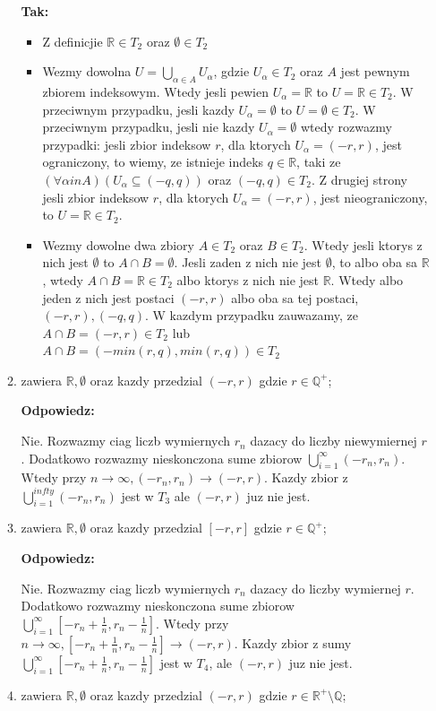\documentclass{article}
\begin{document}
\begin{enumerate}
\begin{enumerate}[label={$T_{\arabic*} :$}]
                \textbf{Tak:}

                \begin{itemize}
                    \item Z definicjie $\mathbb{R} \in T_{2}$ oraz $\emptyset \in T_{2}$
                    \item Wezmy dowolna $U = \bigcup\limits_{\alpha \in A}U_{\alpha}$, gdzie $U_{\alpha} \in T_{2}$ oraz $A$ jest pewnym zbiorem indeksowym. Wtedy jesli pewien $U_{\alpha} = \mathbb{R}$ to $U = \mathbb{R} \in T_{2}$. W przeciwnym przypadku, jesli kazdy $U_{\alpha} = \emptyset$ to $U = \emptyset \in T_{2}$. W przeciwnym przypadku, jesli nie kazdy $U_{\alpha} = \emptyset$ wtedy rozwazmy przypadki: jesli zbior indeksow $r$, dla ktorych $U_{\alpha} = (-r,r)$, jest ograniczony, to wiemy, ze istnieje indeks $q \in  \mathbb{R}$, taki ze $(\forall \alpha in A)(U_{\alpha} \subseteq (-q,q))$ oraz $(-q,q) \in T_{2}$. Z drugiej strony jesli zbior indeksow $r$, dla ktorych $U_{\alpha} = (-r,r)$, jest nieograniczony, to $U = \mathbb{R} \in T_{2}$. 
                    \item Wezmy dowolne dwa zbiory $A \in T_{2}$ oraz $B \in T_{2}$. Wtedy jesli ktorys z nich jest $\emptyset$ to $A \cap B = \emptyset$. Jesli zaden z nich nie jest $\emptyset$, to albo oba sa $\mathbb{R}$, wtedy $A \cap B = \mathbb{R} \in T_{2}$ albo ktorys z nich nie jest $ \mathbb{R}$. Wtedy albo jeden z nich jest postaci $(-r,r)$ albo oba sa tej postaci, $(-r,r), (-q,q)$. W kazdym przypadku zauwazamy, ze $A \cap B = (-r,r) \in T_{2}$ lub $A \cap B = (-min(r,q), min(r,q)) \in T_{2}$
                \end{itemize}
            \item zawiera $\mathbb{R}, \emptyset$ oraz kazdy przedzial $(-r,r)$ gdzie $r \in {\mathbb{Q}}^{+}$;

                \textbf{Odpowiedz:}

                Nie. Rozwazmy ciag liczb wymiernych $r_{n}$ dazacy do liczby niewymiernej $r$. Dodatkowo rozwazmy nieskonczona sume zbiorow $\bigcup\limits_{i=1}^{\infty}(-r_{n}, r_{n})$. Wtedy przy $n \rightarrow \infty, (-r_{n}, r_{n}) \rightarrow (-r, r)$. Kazdy zbior z  $\bigcup\limits_{i=1}^{infty}(-r_{n}, r_{n})$ jest w $T_{3}$ ale $(-r, r)$ juz nie jest.
            \item zawiera $\mathbb{R}, \emptyset$ oraz kazdy przedzial $[-r,r]$ gdzie $r \in {\mathbb{Q}}^{+}$;

                \textbf{Odpowiedz:}

                Nie. Rozwazmy ciag liczb wymiernych $r_{n}$ dazacy do liczby wymiernej $r$. Dodatkowo rozwazmy nieskonczona sume zbiorow $\bigcup\limits_{i=1}^{\infty}[-r_{n} + \frac{1}{n}, r_{n} - \frac{1}{n}]$. Wtedy przy $n  \rightarrow \infty, [-r_{n} + \frac{1}{n}, r_{n} - \frac{1}{n}] \rightarrow (-r, r)$. Kazdy zbior z sumy  $\bigcup\limits_{i=1}^{\infty}[-r_{n} + \frac{1}{n}, r_{n} - \frac{1}{n}]$ jest w $T_{4}$, ale $(-r, r)$ juz nie jest.
            \item zawiera $\mathbb{R}, \emptyset$ oraz kazdy przedzial $(-r,r)$ gdzie $r \in {\mathbb{R}}^{+} \setminus \mathbb{Q}$;


\end{enumerate}
\end{enumerate}
\end{document}
